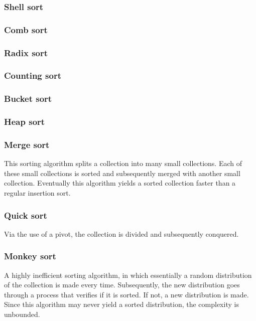 \documentclass{article}
\begin{document}
\subsubsection{Shell sort}


\subsubsection{Comb sort}


\subsubsection{Radix sort}


\subsubsection{Counting sort}


\subsubsection{Bucket sort}


\subsubsection{Heap sort}


\subsubsection{Merge sort}
This sorting algorithm splits a collection into many small collections.
Each of these small collections is sorted and subsequently merged with another small collection.
Eventually this algorithm yields a sorted collection faster than a regular insertion sort.

\subsubsection{Quick sort}
Via the use of a pivot, the collection is divided and subsequently conquered.

\subsubsection{Monkey sort}
A highly inefficient sorting algorithm, in which essentially a random distribution of the collection is made every time.
Subsequently, the new distribution goes through a process that verifies if it is sorted. If not, a new distribution is made.
Since this algorithm may never yield a sorted distribution, the complexity is unbounded.
\end{document}
